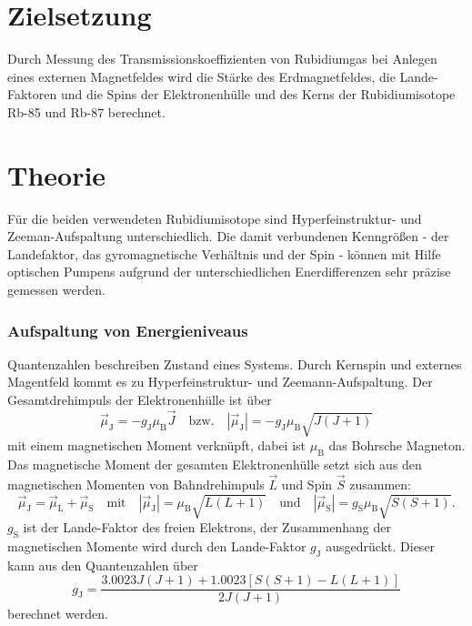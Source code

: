 \section{Zielsetzung}
Durch Messung des Transmissionskoeffizienten von Rubidiumgas bei Anlegen eines externen Magnetfeldes wird die
Stärke des Erdmagnetfeldes, die Lande-Faktoren und die Spins der Elektronenhülle und des Kerns der Rubidiumisotope
Rb-85 und Rb-87 berechnet.

\section{Theorie}

Für die beiden verwendeten Rubidiumisotope sind Hyperfeinstruktur- und Zeeman-Aufspaltung unterschiedlich. Die damit
verbundenen Kenngrößen - der Landefaktor, das gyromagnetische Verhältnis und der Spin - können mit Hilfe optischen
Pumpens aufgrund der unterschiedlichen Enerdifferenzen sehr präzise gemessen werden.

\subsubsection{Aufspaltung von Energieniveaus}

Quantenzahlen beschreiben Zustand eines Systems. Durch Kernspin und externes Magentfeld kommt es zu Hyperfeinstruktur-
und Zeemann-Aufspaltung.
Der Gesamtdrehimpuls der Elektronenhülle  ist über
\begin{equation}
  \vec{\mu}_\text{J} = -g_\text{J}\mu_\text{B}\vec{J} \quad \text{bzw.} \quad |\vec{\mu}_\text{J}| = -g_\text{J}\mu_\text{B}\sqrt{J (J + 1)}
  \label{magnMom}
\end{equation}
mit einem magnetischen Moment verknüpft, dabei ist $\mu_\text{B}$ das Bohrsche Magneton. Das magnetische Moment der gesamten
Elektronenhülle setzt sich aus den magnetischen Momenten von Bahndrehimpuls $\vec{L}$ und Spin $\vec{S}$ zusammen:
\begin{equation}
  \vec{\mu}_\text{J} = \vec{\mu}_\text{L} + \vec{\mu}_\text{S} \quad \text{mit} \quad |\vec{\mu}_\text{J}| = \mu_\text{B}\sqrt{L (L + 1)} \quad \text{und}
  \quad |\vec{\mu}_\text{S}| = g_\text{S}\mu_\text{B}\sqrt{S (S + 1)}.
\end{equation}
$g_\text{S}$ ist der Lande-Faktor des freien Elektrons, der Zusammenhang der magnetischen Momente wird durch den Lande-Faktor
$g_\text{J}$ ausgedrückt.
Dieser kann aus den Quantenzahlen über
\begin{equation}
  g_\text{J} = \frac{3.0023J(J+1) + 1.0023[S(S+1) - L(L+1)]}{2J(J+1)}
\end{equation}
berechnet werden.


